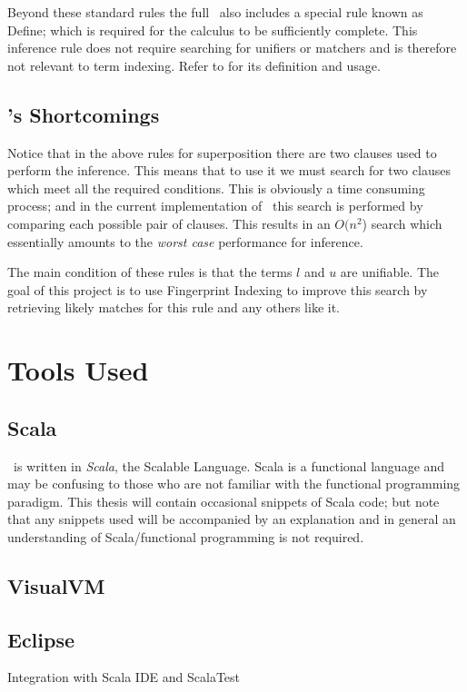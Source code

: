 Beyond these standard rules the full \HSWAC\ also includes a special
rule known as Define; which is required for the calculus to be sufficiently
complete. This inference rule does not require searching for unifiers or matchers
and is therefore not relevant to term indexing. Refer to \cite{baum13} for its
definition and usage.

\subsection{\Beagle's Shortcomings}
\label{sec:shortcomings}
Notice that in the above rules for superposition there are two clauses used
to perform the inference. This means that to use it we must search for two clauses
which meet all the required conditions. This is obviously a time consuming process;
and in the current implementation of \beagle\ this search is performed by comparing
each possible pair of clauses. This results in an $O(n^2$) search which essentially amounts to the \emph{worst case}
performance for inference.

The main condition of these rules is that the terms
$l$ and $u$ are unifiable. The goal of this project is to use Fingerprint Indexing to improve
this search by retrieving likely matches for this rule and any others like it.


\section{Tools Used}

\subsection{Scala}
\label{sec:scala}

\Beagle\ is written in \emph{Scala}, the Scalable Language. Scala
is a functional language and may be confusing to those who are not familiar with the
functional programming paradigm. This thesis will contain occasional snippets of
Scala code; but note that any snippets used will be accompanied by an explanation
and in general an understanding of Scala/functional programming is not required.

\cite{scala}

\subsection{VisualVM}
\cite{visualvm}

\subsection{Eclipse}
\label{sec:eclipse}
Integration with Scala IDE and ScalaTest

\cite{eclipse}
\cite{scalaide}
\cite{scalatest}

